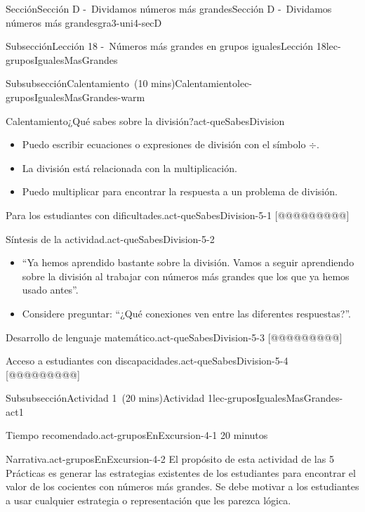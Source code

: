 \documentclass[oneside,10pt,]{article}
\begin{document}
\begin{sectionptx}{Sección}{Sección D -~Dividamos números más grandes}{}{Sección D -~Dividamos números más grandes}{}{}{gra3-uni4-secD}
\begin{subsectionptx}{Subsección}{Lección 18 -~Números más grandes en grupos iguales}{}{Lección 18}{}{}{lec-gruposIgualesMasGrandes}
\begin{subsubsectionptx}{Subsubsección}{Calentamiento~(10 mins)}{}{Calentamiento}{}{}{lec-gruposIgualesMasGrandes-warm}
\begin{exploration}{Calentamiento}{¿Qué sabes sobre la división?}{act-queSabesDivision}
\begin{itemize}[label=\textbullet]
\item{}Puedo escribir ecuaciones o expresiones de división con el símbolo \(\div\).%
\item{}La división está relacionada con la multiplicación.%
\item{}Puedo multiplicar para encontrar la respuesta a un problema de división.%
\end{itemize}
\end{exploration}%
\par
\begin{paragraphs}{Para los estudiantes con dificultades.}{act-queSabesDivision-5-1}%
[@@@@@@@@@]%
\end{paragraphs}%
\begin{paragraphs}{Síntesis de la actividad.}{act-queSabesDivision-5-2}%
%
\begin{itemize}[label=\textbullet]
\item{}``Ya hemos aprendido bastante sobre la división. Vamos a seguir aprendiendo sobre la división al trabajar con números más grandes que los que ya hemos usado antes''.%
\item{}Considere preguntar: ``¿Qué conexiones ven entre las diferentes respuestas?''.%
\end{itemize}
\end{paragraphs}%
\begin{paragraphs}{Desarrollo de lenguaje matemático.}{act-queSabesDivision-5-3}%
[@@@@@@@@@]%
\end{paragraphs}%
\begin{paragraphs}{Acceso a estudiantes con discapacidades.}{act-queSabesDivision-5-4}%
[@@@@@@@@@]%
\end{paragraphs}%
\end{subsubsectionptx}
%
%
\typeout{************************************************}
\typeout{************************************************}
%
\begin{subsubsectionptx}{Subsubsección}{Actividad 1~(20 mins)}{}{Actividad 1}{}{}{lec-gruposIgualesMasGrandes-act1}
\par
\begin{paragraphs}{Tiempo recomendado.}{act-gruposEnExcursion-4-1}%
20 minutos%
\end{paragraphs}%
\begin{paragraphs}{Narrativa.}{act-gruposEnExcursion-4-2}%
El propósito de esta actividad de las 5 Prácticas es generar las estrategias existentes de los estudiantes para encontrar el valor de los cocientes con números más grandes. Se debe motivar a los estudiantes a usar cualquier estrategia o representación que les parezca lógica.%

\end{paragraphs}
\end{subsubsectionptx}
\end{subsectionptx}
\end{sectionptx}
\end{document}
